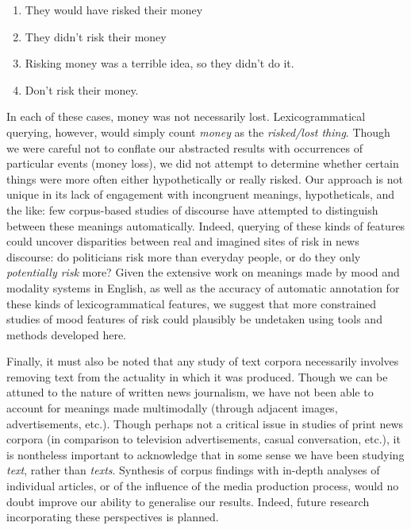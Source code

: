         \begin{enumerate} [before=\color{black}\ttfamily] \setlength\itemsep{0em} \small \setlength\itemsep{0em} \small
            \item They would have risked their money
            \item They didn't risk their money
            \item Risking money was a terrible idea, so they didn't do it.
            \item Don't risk their money.
        \end{enumerate}
        In each of these cases, money was not necessarily lost. Lexicogrammatical querying, however, would simply count \emph{money} as the \emph{risked\slash lost thing}. Though we were careful not to conflate our abstracted results with occurrences of particular events (money loss), we did not attempt to determine whether certain things were more often either hypothetically or really risked. Our approach is not unique in its lack of engagement with incongruent meanings, hypotheticals, and the like: few corpus-based studies of discourse have attempted to distinguish between these meanings automatically. Indeed, querying of these kinds of features could uncover disparities between real and imagined sites of risk in news discourse: do politicians risk more than everyday people, or do they only \emph{potentially risk} more? Given the extensive work on meanings made by mood and modality systems in English, as well as the accuracy of automatic annotation for these kinds of lexicogrammatical features, we suggest that more constrained studies of mood features of risk could plausibly be undetaken using tools and methods developed here.

        Finally, it must also be noted that any study of text corpora necessarily involves removing text from the actuality in which it was produced. Though we can be attuned to the nature of written news journalism, we have not been able to account for meanings made multimodally (through adjacent images, advertisements, etc.). Though perhaps not a critical issue in studies of print news corpora (in comparison to television advertisements, casual conversation, etc.), it is nontheless important to acknowledge that in some sense we have been studying \emph{text}, rather than \emph{texts}. Synthesis of corpus findings with in-depth analyses of individual articles, or of the influence of the media production process, would no doubt improve our ability to generalise our results. Indeed, future research incorporating these perspectives is planned.

